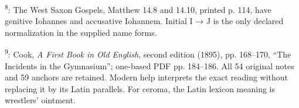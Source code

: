 \textsuperscript{8}: The West Saxon Gospels, Matthew 14.8 and 14.10, printed p. 114, have genitive Iohannes and accusative Iohannem. Initial I → J is the only declared normalization in the supplied name forms.

\textsuperscript{9}: Cook, \emph{A First Book in Old English}, second edition (1895), pp. 168–170, “The Incidents in the Gymnasium”; one-based PDF pp. 184–186. All 54 original notes and 59 anchors are retained. Modern help interprets the exact reading without replacing it by its Latin parallels. For ceroma, the Latin lexicon meaning is wrestlers’ ointment.

\endgroup

\par\label{end-ch16-learner}
\clearpage\endgroup
